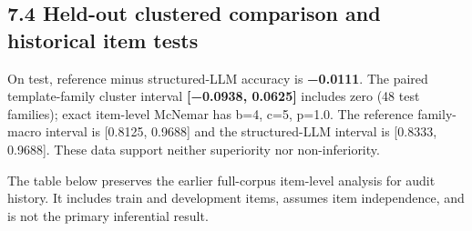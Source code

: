 \subsection{7.4 Held-out clustered comparison and historical item
tests}\label{held-out-clustered-comparison-and-historical-item-tests}

On test, reference minus structured-LLM accuracy is \textbf{−0.0111}.
The paired template-family cluster interval \textbf{{[}−0.0938,
0.0625{]}} includes zero (48 test families); exact item-level McNemar
has b=4, c=5, p=1.0. The reference family-macro interval is {[}0.8125,
0.9688{]} and the structured-LLM interval is {[}0.8333, 0.9688{]}. These
data support neither superiority nor non-inferiority.

The table below preserves the earlier full-corpus item-level analysis
for audit history. It includes train and development items, assumes item
independence, and is not the primary inferential result.

